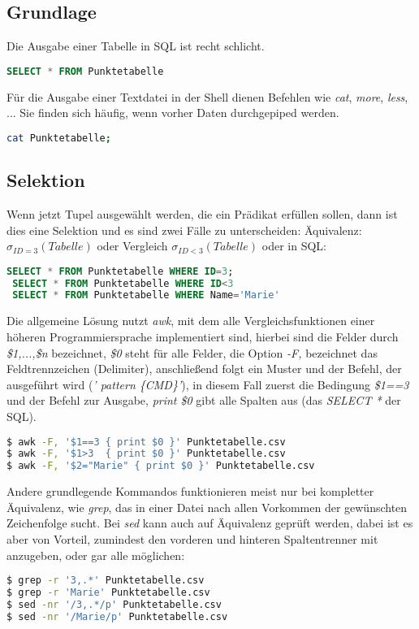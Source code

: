 \subsection{Grundlage}
Die Ausgabe einer Tabelle in SQL ist recht schlicht.
\begin{lstlisting}[language=SQL]
 SELECT * FROM Punktetabelle
\end{lstlisting}
Für die Ausgabe einer Textdatei in der Shell dienen Befehlen wie \textit{cat}, \textit{more}, \textit{less}, ... Sie finden sich häufig, wenn vorher Daten durchgepiped werden.
\begin{lstlisting}[language=Bash]
 cat Punktetabelle;
\end{lstlisting}
\subsection{Selektion}
Wenn jetzt Tupel ausgewählt werden, die ein Prädikat erfüllen sollen, dann ist dies eine Selektion und es sind zwei Fälle zu unterscheiden:
Äquivalenz: $\sigma_{ID=3}(Tabelle)$ oder Vergleich $\sigma_{ID<3}(Tabelle)$ oder in SQL:\\
\begin{lstlisting}[language=SQL]
 SELECT * FROM Punktetabelle WHERE ID=3;
 SELECT * FROM Punktetabelle WHERE ID<3
 SELECT * FROM Punktetabelle WHERE Name='Marie'
\end{lstlisting}

Die allgemeine Lösung nutzt \textit{awk}, mit dem alle Vergleichsfunktionen einer höheren Programmiersprache implementiert sind, hierbei sind die Felder durch \textit{\$1,...,\$n} bezeichnet, \textit{\$0} steht für alle Felder, die Option \textit{-F,} bezeichnet das Feldtrennzeichen (Delimiter), anschließend folgt ein Muster und der Befehl, der ausgeführt wird (\textit{' pattern \{CMD\}'}), in diesem Fall zuerst die Bedingung \textit{\$1==3} und der Befehl zur Ausgabe, \textit{print \$0} gibt alle Spalten aus (das \textit{SELECT *} der SQL).
\begin{lstlisting}[language=Bash]
$ awk -F, '$1==3 { print $0 }' Punktetabelle.csv
$ awk -F, '$1>3  { print $0 }' Punktetabelle.csv
$ awk -F, '$2="Marie" { print $0 }' Punktetabelle.csv
\end{lstlisting}

Andere grundlegende Kommandos funktionieren meist nur bei kompletter Äquivalenz, wie \textit{grep}, das in einer Datei nach allen Vorkommen der gewünschten Zeichenfolge sucht. Bei \textit{sed} kann auch auf Äquivalenz geprüft werden, dabei ist es aber von Vorteil, zumindest den vorderen und hinteren Spaltentrenner mit anzugeben, oder gar alle möglichen:
\begin{lstlisting}[language=Bash]
$ grep -r '3,.*' Punktetabelle.csv
$ grep -r 'Marie' Punktetabelle.csv
$ sed -nr '/3,.*/p' Punktetabelle.csv
$ sed -nr '/Marie/p' Punktetabelle.csv
\end{lstlisting}

